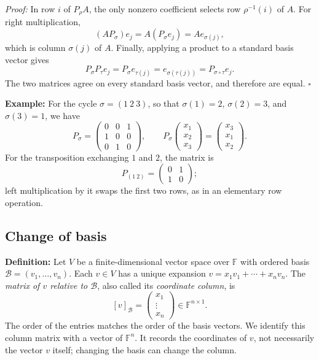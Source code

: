 \documentclass[a4paper,11pt,abstract=true]{scrartcl}
\theoremstyle{dotlessP}
\theoremstyle{dotlessS}
\theoremstyle{remark}
\theoremstyle{definition}
\begin{document}
\begin{claim_box}
\textit{Proof:} In row $i$ of $P_{\rho}A$, the only nonzero coefficient
selects row $\rho^{-1}(i)$ of $A$. For right multiplication,
\[
(AP_{\sigma})e_j=A(P_{\sigma}e_j)=Ae_{\sigma(j)},
\]
which is column $\sigma(j)$ of $A$. Finally, applying a product to a
standard basis vector gives
\[
P_{\sigma}P_{\tau}e_j
=P_{\sigma}e_{\tau(j)}
=e_{\sigma(\tau(j))}
=P_{\sigma\circ\tau}e_j.
\]
The two matrices agree on every standard basis vector, and therefore
are equal. \hfill$\square$
\end{claim_box}

\begin{example_box}
\textbf{Example:} For the cycle $\sigma=(1\ 2\ 3)$, so that
$\sigma(1)=2$, $\sigma(2)=3$, and $\sigma(3)=1$, we have
\[
P_{\sigma}=\begin{pmatrix}0&0&1\\1&0&0\\0&1&0\end{pmatrix},
\qquad
P_{\sigma}\begin{pmatrix}x_1\\x_2\\x_3\end{pmatrix}
=\begin{pmatrix}x_3\\x_1\\x_2\end{pmatrix}.
\]
For the transposition exchanging $1$ and $2$, the matrix is
\[
P_{(1\ 2)}=\begin{pmatrix}0&1\\1&0\end{pmatrix};
\]
left multiplication by it swaps the first two rows, as in an elementary
row operation.
\end{example_box}
\subsection{Change of basis}

\begin{definition_box}
\textbf{Definition:} Let $V$ be a
finite-dimensional vector space over $\mathbb{F}$ with ordered basis
$\mathcal{B}=(v_1,\ldots,v_n)$. Each $v\in V$ has a unique expansion
$v=x_1 v_1+\cdots+x_n v_n$. The \emph{matrix of $v$ relative to
$\mathcal{B}$}, also called its \emph{coordinate column}, is
\[
{[v]}_{\mathcal{B}}=
\begin{pmatrix}x_1\\\vdots\\x_n\end{pmatrix}
\in\mathbb{F}^{n\times1}.
\]
The order of the entries matches the order of the basis vectors.
We identify this column matrix with a vector of $\mathbb{F}^n$.
It records the coordinates of $v$, not necessarily the vector $v$
itself; changing the basis can change the column.
\end{definition_box}
\end{document}
